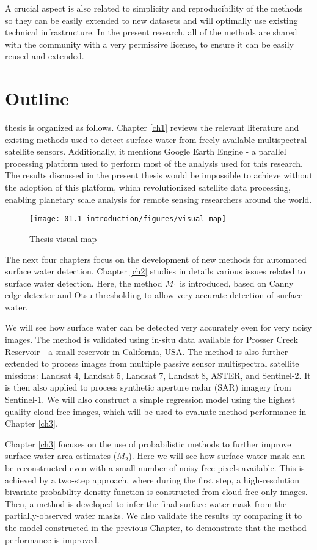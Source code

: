 A crucial aspect is also related to simplicity and reproducibility of the methods so they can be easily extended to new datasets and will optimally use existing technical infrastructure. In the present research, all of the methods are shared with the community with a very permissive license, to ensure it can be easily reused and extended.

\section{Outline}

 thesis is organized as follows. Chapter \ref{ch1} reviews the relevant literature and existing methods used to detect surface water from freely-available multispectral satellite sensors. Additionally, it mentions Google Earth Engine - a parallel processing platform used to perform most of the analysis used for this research. The results discussed in the present thesis would be impossible to achieve without the adoption of this platform, which revolutionized satellite data processing, enabling planetary scale analysis for remote sensing researchers around the world. 

\begin{figure}[H]
	\texttt{[image: 01.1-introduction/figures/visual-map]}
	\caption{Thesis visual map}
	\label{fig:outline}
\end{figure}

The next four chapters focus on the development of new methods for automated surface water detection. Chapter \ref{ch2} studies in details various issues related to surface water detection. Here, the method $M_1$ is introduced, based on Canny edge detector and Otsu thresholding to allow very accurate detection of surface water. 

We will see how surface water can be detected very accurately even for very noisy images. The method is validated using in-situ data available for Prosser Creek Reservoir - a small reservoir in California, USA. The method is also further extended to process images from multiple passive sensor multispectral satellite missions: Landsat 4, Landsat 5, Landsat 7, Landsat 8, ASTER, and Sentinel-2. It is then also applied to process synthetic aperture radar (SAR) imagery from Sentinel-1. We will also construct a simple regression model using the highest quality cloud-free images, which will be used to evaluate method performance in Chapter \ref{ch3}. 

Chapter \ref{ch3} focuses on the use of probabilistic methods to further improve surface water area estimates ($M_2$). Here we will see how surface water mask can be reconstructed even with a small number of noisy-free pixels available. This is achieved by a two-step approach, where during the first step, a high-resolution bivariate probability density function is constructed from cloud-free only images. Then, a method is developed to infer the final surface water mask from the partially-observed water masks. We also validate the results by comparing it to the model constructed in the previous Chapter, to demonstrate that the method performance is improved.

